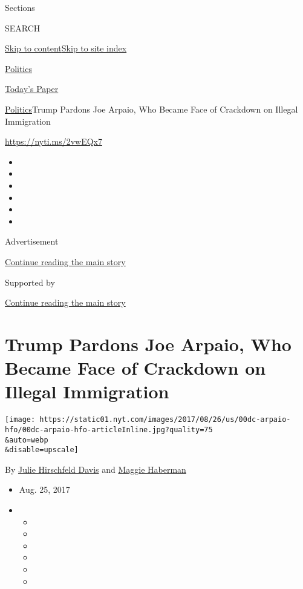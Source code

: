 Sections

SEARCH

\protect\hyperlink{site-content}{Skip to
content}\protect\hyperlink{site-index}{Skip to site index}

\href{https://www.nytimes.com/section/politics}{Politics}

\href{https://myaccount.nytimes.com/auth/login?response_type=cookie\&client_id=vi}{}

\href{https://www.nytimes.com/section/todayspaper}{Today's Paper}

\href{/section/politics}{Politics}\textbar{}Trump Pardons Joe Arpaio,
Who Became Face of Crackdown on Illegal Immigration

\url{https://nyti.ms/2vwEQx7}

\begin{itemize}
\item
\item
\item
\item
\item
\item
\end{itemize}

Advertisement

\protect\hyperlink{after-top}{Continue reading the main story}

Supported by

\protect\hyperlink{after-sponsor}{Continue reading the main story}

\hypertarget{trump-pardons-joe-arpaio-who-became-face-of-crackdown-on-illegal-immigration}{%
\section{Trump Pardons Joe Arpaio, Who Became Face of Crackdown on
Illegal
Immigration}\label{trump-pardons-joe-arpaio-who-became-face-of-crackdown-on-illegal-immigration}}

\texttt{[image: https://static01.nyt.com/images/2017/08/26/us/00dc-arpaio-hfo/00dc-arpaio-hfo-articleInline.jpg?quality=75\\\&auto=webp\\\&disable=upscale]}

By \href{https://www.nytimes.com/by/julie-hirschfeld-davis}{Julie
Hirschfeld Davis} and
\href{http://www.nytimes.com/by/maggie-haberman}{Maggie Haberman}

\begin{itemize}
\item
  Aug. 25, 2017
\item
  \begin{itemize}
  \item
  \item
  \item
  \item
  \item
  \item
  \end{itemize}
\end{itemize}

